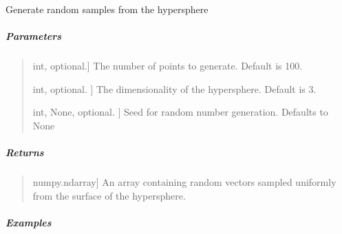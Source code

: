 \documentclass[letterpaper,10pt,english,openany,oneside]{sphinxmanual}
\begin{document}
\begin{fulllineitems}
\label{\detokenize{api_reference/generated/QuadratiK.tools.sample_hypersphere:QuadratiK.tools.sample_hypersphere}}
\pysigstartsignatures
{}
\pysigstopsignatures
\sphinxAtStartPar
Generate random samples from the hypersphere


\subparagraph{Parameters}
\label{\detokenize{api_reference/generated/QuadratiK.tools.sample_hypersphere:parameters}}\begin{quote}
\begin{description}
\sphinxlineitem{npoints}{[}int, optional.{]}
\sphinxAtStartPar
The number of points to generate. 
Default is 100.

\sphinxlineitem{ndim}{[}int, optional. {]}
\sphinxAtStartPar
The dimensionality of the hypersphere.
Default is 3.

\sphinxlineitem{random\_state}{[}int, None, optional. {]}
\sphinxAtStartPar
Seed for random number generation. Defaults to None

\end{description}
\end{quote}


\subparagraph{Returns}
\label{\detokenize{api_reference/generated/QuadratiK.tools.sample_hypersphere:returns}}\begin{quote}
\begin{description}
\sphinxlineitem{data on sphere}{[}numpy.ndarray{]}
\sphinxAtStartPar
An array containing random vectors sampled uniformly 
from the surface of the hypersphere.

\end{description}
\end{quote}


\subparagraph{Examples}
\label{\detokenize{api_reference/generated/QuadratiK.tools.sample_hypersphere:examples}}
\begin{sphinxVerbatim}[commandchars=\\\{\}]
   
  
\PYG{p}{[}\PYG{p}{[}     \PYG{p}{]}
       \PYG{p}{[}   \PYG{p}{]} 
\end{sphinxVerbatim}


\end{fulllineitems}
\end{document}

